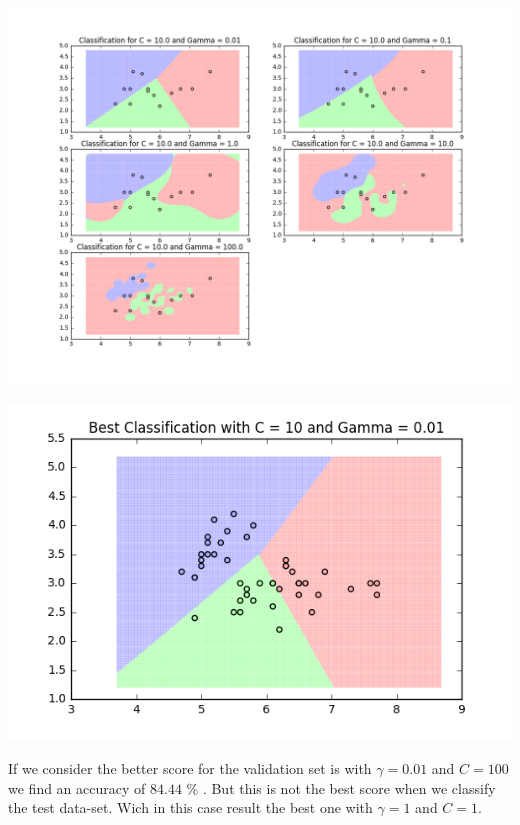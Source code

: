 \documentclass[11pt]{article}
\theoremstyle{plain}
\begin{document}
\begin{center}
\includegraphics[scale=0.5]{5}
\end{center}

\begin{center}
\includegraphics[scale=0.5]{6}
\end{center}

If we consider the better score for the validation set is with $\gamma=0.01$ and $C=100$ we find  an accuracy of $84.44$ \% . But this is not the best score when we classify the test data-set.  Wich in this case result the best one with $\gamma = 1$ and $C =1 $.
\\
\end{document}
